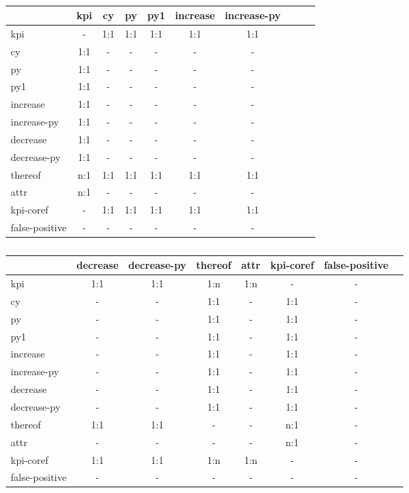 \documentclass[conference, table]{IEEEtran}
\newcommand{\1} {\mathbbm{1}}
\begin{document}
\begin{table}[t]
\scriptsize
\setlength\tabcolsep{6pt}
\begin{subfigure}[b]{\linewidth}
\centering
{}
\begin{tabular}{lccccccccc}
\toprule
{} &  kpi  &  cy &  py &  py1 & increase & increase-py \\
\midrule
kpi             & - & 1:1 & 1:1 & 1:1 & 1:1 & 1:1 \\
cy             & 1:1 & - & - & - & - & - \\
py             & 1:1 & - & - & - & - & - \\
py1            & 1:1 & - & - & - & - & - \\
increase       & 1:1 & - & - & - & - & - \\
increase-py    & 1:1 & - & - & - & - & - \\
decrease       & 1:1 & - & - & - & - & - \\
decrease-py    & 1:1 & - & - & - & - & - \\
thereof        & n:1 & 1:1 & 1:1 & 1:1 & 1:1 & 1:1 \\
attr           & n:1 & - & - & - & - & - \\
kpi-coref      & - & 1:1 & 1:1 & 1:1 & 1:1 & 1:1 \\
false-positive & - & - & - & - & - & - \\
\bottomrule
\end{tabular}
\caption{}
\end{subfigure}

\setlength\tabcolsep{2pt}
\begin{subfigure}[b]{\linewidth}
\centering
{}
\begin{tabular}{lccccccc}
\toprule
{} & decrease & decrease-py & thereof & attr & kpi-coref & false-positive \\
\midrule
kpi            & 1:1 & 1:1 & 1:n & 1:n & - & - \\
cy             & - & - & 1:1 & - & 1:1 & - \\
py             & - & - & 1:1 & - & 1:1 & - \\
py1            & - & - & 1:1 & - & 1:1 & - \\
increase       & - & - & 1:1 & - & 1:1 & - \\
increase-py    & - & - & 1:1 & - & 1:1 & - \\
decrease       & - & - & 1:1 & - & 1:1 & - \\
decrease-py    & - & - & 1:1 & - & 1:1 & - \\
thereof        & 1:1 & 1:1 & - & - & n:1 & - \\
attr           & - & - & - & - & n:1 & - \\
kpi-coref      & 1:1 & 1:1 & 1:n & 1:n & - & - \\
false-positive & - & - & - & - & - & - \\
\bottomrule
\end{tabular}
\caption{}
\end{subfigure}


\end{table}
\end{document}
